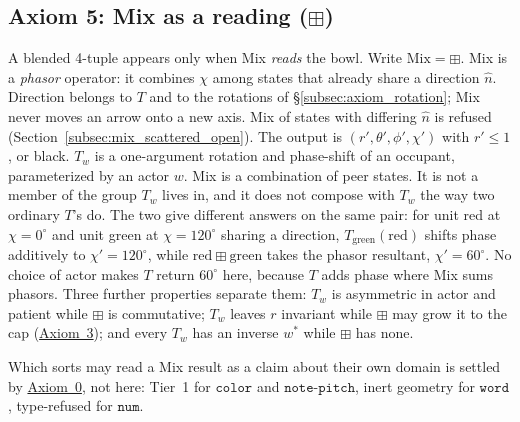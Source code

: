 \documentclass[12pt, a4paper]{article}
\begin{document}
\subsection{Axiom 5: Mix as a reading (\texorpdfstring{$\boxplus$}{boxplus})}
\label{subsec:axiom_interference}
A blended 4-tuple appears only when Mix \emph{reads} the bowl.
Write $\mathrm{Mix}=\boxplus$. Mix is a \emph{phasor} operator: it
combines $\chi$ among states that already share a direction $\hat n$.
Direction belongs to $T$ and to the rotations of
\S\ref{subsec:axiom_rotation}; Mix never moves an arrow onto a new
axis. Mix of states with differing $\hat n$ is refused
(Section~\ref{subsec:mix_scattered_open}). The output is
$(r',\theta',\phi',\chi')$ with $r'\le 1$, or black.
$T_w$ is a one-argument rotation and phase-shift of an occupant,
parameterized by an actor $w$. Mix is a combination of
peer states. It is not a member of the group $T_w$ lives in, and it
does not compose with $T_w$ the way two ordinary $T$'s do. The two
give different answers on the same pair: for unit red at $\chi=0^\circ$
and unit green at $\chi=120^\circ$ sharing a direction,
$T_{\mathrm{green}}(\mathrm{red})$ shifts phase additively to
$\chi'=120^\circ$, while $\mathrm{red}\boxplus\mathrm{green}$ takes the
phasor resultant, $\chi'=60^\circ$. No choice of actor makes $T$
return $60^\circ$ here, because $T$ adds phase where Mix sums phasors.
Three further properties separate them: $T_w$ is asymmetric in actor
and patient while $\boxplus$ is commutative; $T_w$ leaves $r$ invariant
while $\boxplus$ may grow it to the cap
(\hyperref[subsec:axiom_white]{Axiom~3}); and every $T_w$ has an inverse
$w^{*}$ while $\boxplus$ has none.

Which sorts may read a Mix result as a claim about their own domain is
settled by \hyperref[subsec:axiom0_admissibility]{Axiom~0}, not here: Tier~1
for $\mathtt{color}$ and $\mathtt{note\text{-}pitch}$, inert geometry
for $\mathtt{word}$, type-refused for $\mathtt{num}$.
\end{document}
